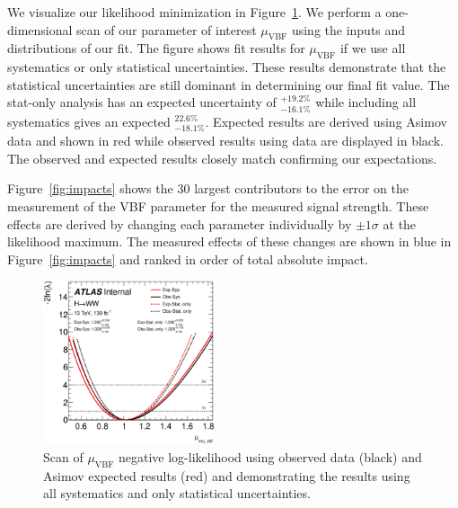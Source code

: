 We visualize our likelihood minimization in Figure~\ref{fig:scan}. We perform a one-dimensional scan of our parameter of interest $\mu_{\text{VBF}}$ using the inputs and distributions of our fit. The figure shows fit results for $\mu_{\text{VBF}}$ if we use all systematics or only statistical uncertainties. These results demonstrate that the statistical uncertainties are still dominant in determining our final fit value. The stat-only analysis has an expected uncertainty of $^{+19.2\%}_{-16.1\%}$ while including all systematics gives an expected $^{22.6\%}_{-18.1\%}$. Expected results are derived using Asimov data and shown in red while observed results using data are displayed in black. The observed and expected results closely match confirming our expectations.

Figure~\ref{fig:impacts} shows the 30 largest contributors to the error on the measurement of the VBF parameter for the measured signal strength. These effects are derived by changing each parameter individually by $\pm 1\sigma$ at the likelihood maximum. The measured effects of these changes are shown in blue in Figure~\ref{fig:impacts} and ranked in order of total absolute impact. 

\begin{figure}[!h]
\centering
\includegraphics[width=0.45\textwidth]{Pictures/fitresults/mu_vbf.eps}
\caption{Scan of $\mu_{\text{VBF}}$ negative log-likelihood using observed data (black) and Asimov expected results (red) and demonstrating the results using all systematics and only statistical uncertainties.}
\label{fig:scan}
\end{figure}

